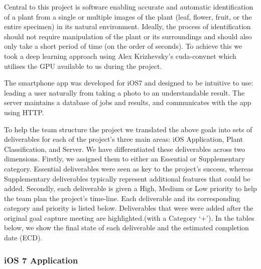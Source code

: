 \documentclass[a4paper,11pt]{article}
\begin{document}
Central to this project is software enabling accurate and automatic identification of a plant from a single or multiple images of the plant (leaf, flower, fruit, or the entire specimen) in its natural environment.  Ideally, the process of identification should not require manipulation of the plant or its surroundings and should also only take a short period of time (on the order of seconds). To achieve this we took a deep learning approach using Alex Krizhevsky's cuda-convnet which utilises the GPU available to us during the project.

The smartphone app was developed for iOS7 and designed to be intuitive to use: leading a user naturally from taking a photo to an understandable result. The server maintains a database of jobs and results, and communicates with the app using HTTP.

To help the team structure the project we translated the above goals into sets of deliverables for each of the project's three main areas: iOS Application, Plant Classification, and Server. We have differentiated these deliverables across two dimensions. Firstly, we assigned them to either an Essential or Supplementary category. Essential deliverables were seen as key to the project's success, whereas Supplementary deliverables typically represent additional features that could be added. Secondly, each deliverable is given a High, Medium or Low priority to help the team plan the project's time-line. Each deliverable and its corresponding category and priority is listed below. Deliverables that were were added after the original goal capture meeting are highlighted.(with a Category `$+$'). In the tables below, we show the final state of each deliverable and the estimated completion date (ECD).\\

\subsubsection{iOS 7 Application}
\end{document}
